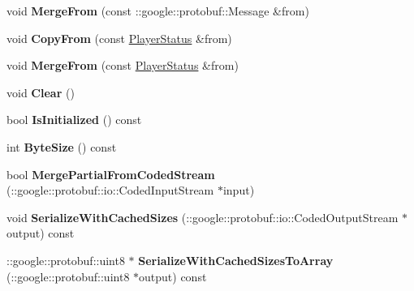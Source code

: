 \begin{DoxyCompactItemize}
\item 
\hypertarget{class_player_status_abf908695ca2070f30ac7289cd5b6ebc9}{void {\bfseries Merge\-From} (const \-::google\-::protobuf\-::\-Message \&from)}\label{class_player_status_abf908695ca2070f30ac7289cd5b6ebc9}

\item 
\hypertarget{class_player_status_a59b13d7a4c4d170bbf103ce9650c76af}{void {\bfseries Copy\-From} (const \hyperlink{class_player_status}{Player\-Status} \&from)}\label{class_player_status_a59b13d7a4c4d170bbf103ce9650c76af}

\item 
\hypertarget{class_player_status_a299630c8c40e216a67c3a6f7b9af6e71}{void {\bfseries Merge\-From} (const \hyperlink{class_player_status}{Player\-Status} \&from)}\label{class_player_status_a299630c8c40e216a67c3a6f7b9af6e71}

\item 
\hypertarget{class_player_status_a869a9837799852d1d5c4c30cefd495a8}{void {\bfseries Clear} ()}\label{class_player_status_a869a9837799852d1d5c4c30cefd495a8}

\item 
\hypertarget{class_player_status_af77a5dbd97872bc975b8b3a0804ea84e}{bool {\bfseries Is\-Initialized} () const }\label{class_player_status_af77a5dbd97872bc975b8b3a0804ea84e}

\item 
\hypertarget{class_player_status_a1b4ef50237a9ec0e43325b60083c0660}{int {\bfseries Byte\-Size} () const }\label{class_player_status_a1b4ef50237a9ec0e43325b60083c0660}

\item 
\hypertarget{class_player_status_a9616d3aa3ea0be9520e04b51540de136}{bool {\bfseries Merge\-Partial\-From\-Coded\-Stream} (\-::google\-::protobuf\-::io\-::\-Coded\-Input\-Stream $\ast$input)}\label{class_player_status_a9616d3aa3ea0be9520e04b51540de136}

\item 
\hypertarget{class_player_status_a35cd38f2703b11a1966b345b83235917}{void {\bfseries Serialize\-With\-Cached\-Sizes} (\-::google\-::protobuf\-::io\-::\-Coded\-Output\-Stream $\ast$output) const }\label{class_player_status_a35cd38f2703b11a1966b345b83235917}

\item 
\hypertarget{class_player_status_a1886db442fd6e7d70710692d9f0c78ec}{\-::google\-::protobuf\-::uint8 $\ast$ {\bfseries Serialize\-With\-Cached\-Sizes\-To\-Array} (\-::google\-::protobuf\-::uint8 $\ast$output) const }\label{class_player_status_a1886db442fd6e7d70710692d9f0c78ec}


\end{DoxyCompactItemize}
